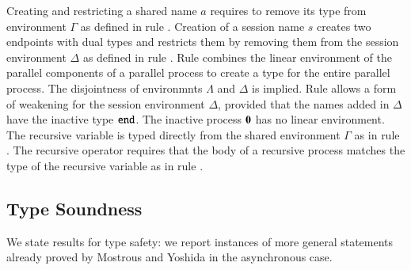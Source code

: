Creating and restricting a
shared name $a$ requires to remove
its type from environment $\Gamma$ as defined in 
rule . 
Creation of a session name $s$
creates two endpoints with dual types and restricts
them by removing them from the session environment
$\Delta$ as defined in rule . 
Rule  combines the linear environment of
the parallel components of a parallel process
to create a type for the entire parallel process.
The disjointness of environmnts $\Lambda$ and $\Delta$
is implied. Rule  allows a form of weakening 
for the session environment $\Delta$, provided that
the names added in $\Delta$ have the inactive
type $\mathtt{end}$. The inactive process $\mathbf{0}$ has no
linear environment. The recursive variable is typed
directly from the shared environment $\Gamma$ as
in rule .
The recursive operator requires that the body of
a recursive process matches the type of the recursive
variable as in rule .

%


\subsection{Type Soundness}
We state results for type safety:
we report instances of more general statements already proved by
Mostrous and Yoshida in the asynchronous case.

